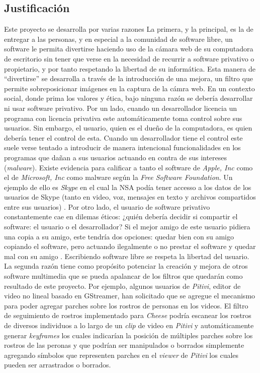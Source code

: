 \documentclass[a4paper,openright,12pt]{report}
\begin{document}
\subsection{Justificación}
Este proyecto se desarrolla por varias razones La primera, y la principal, es la
de entregar a las personas, y en especial a la comunidad de software libre, un
software le permita divertirse haciendo uso de la cámara web de su computadora
de escritorio sin tener que verse en la necesidad de recurrir a software
privativo o propietario, y por tanto respetando la libertad de su informática. Esta
manera de ``divertirse'' se desarrolla a través de la introducción de una mejora,
un filtro que permite sobreposicionar imágenes en la captura de la cámra web. En
un contexto social, donde prima los valores y ética, bajo ninguna razón se
debería desarrollar ni usar software privativo. Por un lado, cuando un
desarrollador licencia un programa con licencia privativa este automáticamente
toma control sobre sus usuarios. Sin embargo, el usuario, quien es el dueño de
la computadora, es quien debería tener el control de esta. Cuando un
desarrollador tiene el control este suele verse tentado a introducir de manera
intencional funcionalidades en los programas que dañan a sus usuarios actuando
en contra de sus intereses (\textit{malware}). Existe evidencia para calificar
a tanto el software de \textit{Apple, Inc} como el de \textit{Microsoft, Inc}
como malware \cite{malwareFSF} según la \textit{Free Software Foundation}.
Un ejemplo de ello es \textit{Skype} en el cual la NSA podía tener accesso a
los datos de los usuarios de Skype (tanto en video, voz, mensajes en texto y
archivos compartidos entre sus usuarios) \cite{skypeMalware}.
Por otro lado, el usuario de software privativo
constantemente cae en dilemas éticos: ¿quién debería decidir si compartir el
software: el usuario o el desarrollador? Si el mejor amigo de este usuario
pidiera una copia a su amigo, este tendría dos opciones: quedar bien con su
amigo copiando el software, pero actuando ilegalmente o no prestar el software
y quedar mal con su amigo \cite{patentesRMS}. Escribiendo software libre se
respeta la libertad del usuario. La segunda razón tiene como
propósito potenciar la creación y mejora de otros software multimedia que se
pueda apalancar de los filtros que quedarán como resultado de este proyecto.
Por ejemplo, algunos usuarios de \textit{Pitivi}, editor de video no lineal
basado en GStreamer, han solicitado que se agregue el mecanismo para poder
agregar parches sobre los rostros de personas en los videos. El filtro de
seguimiento de rostros implementado para \textit{Cheese} podría escanear los
rostros de diversos individuos a lo largo de un \textit{clip} de video en
\textit{Pitivi} y automáticamente generar \textit{keyframes} los cuales
indicarían la posición de múltiples parches sobre los rostros de las peronas y
que podrían ser manipulados o borrados simplemente agregando símbolos que
representen parches en el \textit{viewer} de \textit{Pitivi} los cuales pueden
ser arrastrados o borrados.
\end{document}

